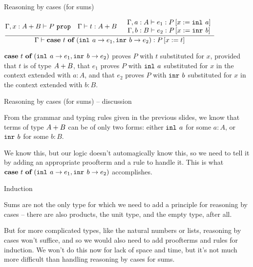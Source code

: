 \documentclass{beamer}
\begin{document}
\begin{frame}{Reasoning by cases (for sums)}

\begin{center}
  $\infrule{\prop[\extend{\Gamma}{x}{\Sum{A}{B}}]{P} \quad \typing{t}{\Sum{A}{B}} \quad \begin{array}{c} \proves[\extend{\Gamma}{a}{A}]{e_1}{\subst{P}{x}{\inl{a}}} \\ \proves[\extend{\Gamma}{b}{B}]{e_2}{\subst{P}{x}{\inr{b}}} \end{array}}{\proves{\sumind{t}{a}{e_1}{b}{e_2}}{\subst{P}{x}{t}}}$
\end{center}

\vspace{2em}

$\textbf{case}\ t\ \textbf{of}\ (\texttt{inl}_{}\ a \rightarrow e_1, \texttt{inr}_{}\ b \rightarrow e_2)$ proves $P$ with $t$ substituted for $x$, provided that $t$ is of type $A + B$, that $e_1$ proves $P$ with $\texttt{inl}_{}\ a$ substituted for $x$ in the context extended with $a : A$, and that $e_2$ proves $P$ with $\texttt{inr}_{}\ b$ substituted for $x$ in the context extended with $b : B$.

\end{frame}

\begin{frame}{Reasoning by cases (for sums) -- discussion}

From the grammar and typing rules given in the previous slides, we know that terms of type $A + B$ can be of only two forms: either $\texttt{inl}_{}\ a$ for some $a : A$, or $\texttt{inr}_{}\ b$ for some $b : B$.

\vspace{2em}

We know this, but our logic doesn't automagically know this, so we need to tell it by adding an appropriate proofterm and a rule to handle it. This is what $\textbf{case}\ t\ \textbf{of}\ (\texttt{inl}_{}\ a \rightarrow e_1, \texttt{inr}_{}\ b \rightarrow e_2)$ accomplishes. 

\end{frame}

\begin{frame}{Induction}

Sums are not the only type for which we need to add a principle for reasoning by cases -- there are also products, the unit type, and the empty type, after all.

\vspace{2em}

But for more complicated types, like the natural numbers or lists, reasoning by cases won't suffice, and so we would also need to add proofterms and rules for induction. We won't do this now for lack of space and time, but it's not much more difficult than handling reasoning by cases for sums.

\end{frame}
\end{document}
